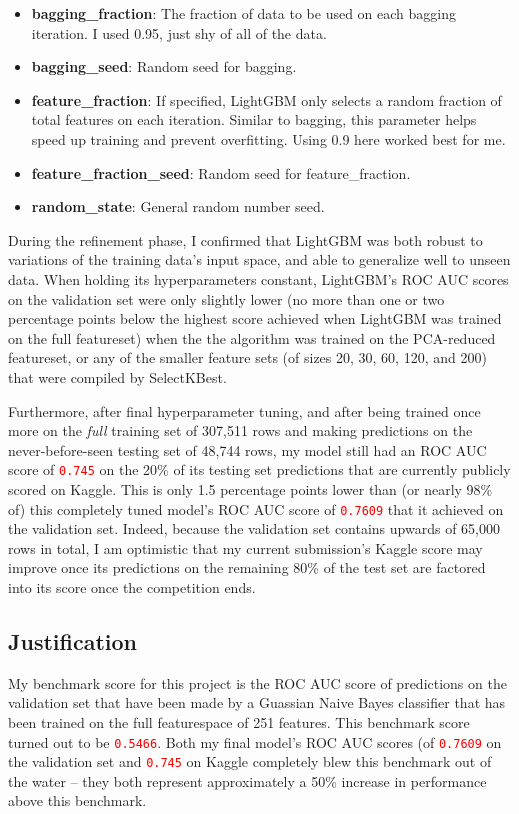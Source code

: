 \documentclass[12pt, letterpaper]{article}
\begin{document}
\begin{itemize}
  \item \textbf{bagging_fraction}: The fraction of data to be used on each bagging iteration. I used 0.95, just shy of all of the data.
  \item \textbf{bagging_seed}: Random seed for bagging.
  \item \textbf{feature_fraction}: If specified, LightGBM only selects a random fraction of total features on each iteration. Similar to bagging, this parameter helps speed up training and prevent overfitting. Using 0.9 here worked best for me.
  \item \textbf{feature_fraction_seed}: Random seed for feature_fraction.
  \item \textbf{random_state}: General random number seed.
\end{itemize}

During the refinement phase, I confirmed that LightGBM was both robust to variations of the training data's input space, and able to generalize well to unseen data. When holding its hyperparameters constant, LightGBM's ROC AUC scores on the validation set were only slightly lower (no more than one or two percentage points below the highest score achieved when LightGBM was trained on the full featureset) when the the algorithm was trained on the PCA-reduced featureset, or any of the smaller feature sets (of sizes 20, 30, 60, 120, and 200) that were compiled by SelectKBest.

Furthermore, after final hyperparameter tuning, and after being trained once more on the \textit{full} training set of 307,511 rows and making predictions on the never-before-seen testing set of 48,744 rows, my model still had an ROC AUC score of \colorbox{backcolor}{\textcolor{red}{\texttt{0.745}}} on the 20\% of its testing set predictions that are currently publicly scored on Kaggle. This is only 1.5 percentage points lower than (or nearly 98\% of) this completely tuned model's ROC AUC score of \colorbox{backcolor}{\textcolor{red}{\texttt{0.7609}}} that it achieved on the validation set. Indeed, because the validation set contains upwards of 65,000 rows in total, I am optimistic that my current submission's Kaggle score may improve once its predictions on the remaining 80\% of the test set are factored into its score once the competition ends.

\subsection{Justification}
My benchmark score for this project is the ROC AUC score of predictions on the validation set that have been made by a Guassian Naive Bayes classifier that has been trained on the full featurespace of 251 features. This benchmark score turned out to be \colorbox{backcolor}{\textcolor{red}{\texttt{0.5466}}}. Both my final model's ROC AUC scores (of \colorbox{backcolor}{\textcolor{red}{\texttt{0.7609}}} on the validation set and \colorbox{backcolor}{\textcolor{red}{\texttt{0.745}}} on Kaggle completely blew this benchmark out of the water -- they both represent approximately a 50\% increase in performance above this benchmark.
\end{document}
